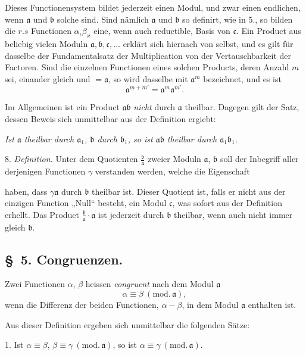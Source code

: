 \documentclass{article}
\begin{document}
Dieses Functionensystem bildet jederzeit einen Modul, und zwar einen endlichen, wenn $\mathfrak{a}$ und $\mathfrak{b}$ solche sind. Sind nämlich $\mathfrak{a}$ und $\mathfrak{b}$ so definirt, wie in 5., so bilden die $r.s$ Functionen $\alpha_{\iota}\beta_{\varkappa}$ eine, wenn auch reductible, Basis von $\mathfrak{c}$. Ein Product aus beliebig vielen Moduln $\mathfrak{a}, \mathfrak{b}, \mathfrak{c}, \ldots$ erklärt sich hiernach von selbst, und es gilt für dasselbe der Fundamentalsatz der Multiplication von der Vertauschbarkeit der Factoren. Sind die einzelnen Functionen eines solchen Products, deren Anzahl $m$ sei, einander gleich und $= \mathfrak{a}$, so wird dasselbe mit $\mathfrak{a}^{m}$ bezeichnet, und es ist
\[ \mathfrak{a}^{m+m'} = \mathfrak{a}^{m}\mathfrak{a}^{m'}. \]

Im Allgemeinen ist ein Product $\mathfrak{a}\mathfrak{b}$ \emph{nicht} durch $\mathfrak{a}$ theilbar. Dagegen gilt der Satz, dessen Beweis sich unmittelbar aus der Definition ergiebt:

\emph{Ist $\mathfrak{a}$ theilbar durch $\mathfrak{a}_{1}$, $\mathfrak{b}$ durch $\mathfrak{b}_{1}$, so ist $\mathfrak{a}\mathfrak{b}$ theilbar durch $\mathfrak{a}_{1}\mathfrak{b}_{1}$.}

8. \emph{Definition.} Unter dem Quotienten $\frac{\mathfrak{b}}{\mathfrak{a}}$ zweier Moduln $\mathfrak{a}$, $\mathfrak{b}$ soll der Inbegriff aller derjenigen Functionen $\gamma$ verstanden werden, welche die Eigenschaft

haben, dass $\gamma\mathfrak{a}$ durch $\mathfrak{b}$ theilbar ist. Dieser Quotient ist, falls er nicht aus der einzigen Function „Null“ besteht, ein Modul $\mathfrak{c}$, was sofort aus der Definition erhellt. Das Product $\frac{\mathfrak{b}}{\mathfrak{a}}\cdot\mathfrak{a}$ ist jederzeit durch $\mathfrak{b}$ theilbar, wenn auch nicht immer gleich $\mathfrak{b}$.

\subsection*{§~5. Congruenzen.}

Zwei Functionen $\alpha$, $\beta$ heissen \emph{congruent} nach dem Modul $\mathfrak{a}$
\[ \alpha \equiv \beta \ (\text{mod.}\,\mathfrak{a}), \]
wenn die Differenz der beiden Functionen, $\alpha-\beta$, in dem Modul $\mathfrak{a}$ enthalten ist.

Aus dieser Definition ergeben sich unmittelbar die folgenden Sätze:

1. Ist $\alpha \equiv \beta$, $\beta \equiv \gamma \ (\text{mod.}\,\mathfrak{a})$, so ist $\alpha \equiv \gamma \ (\text{mod.}\,\mathfrak{a})$.
\end{document}
